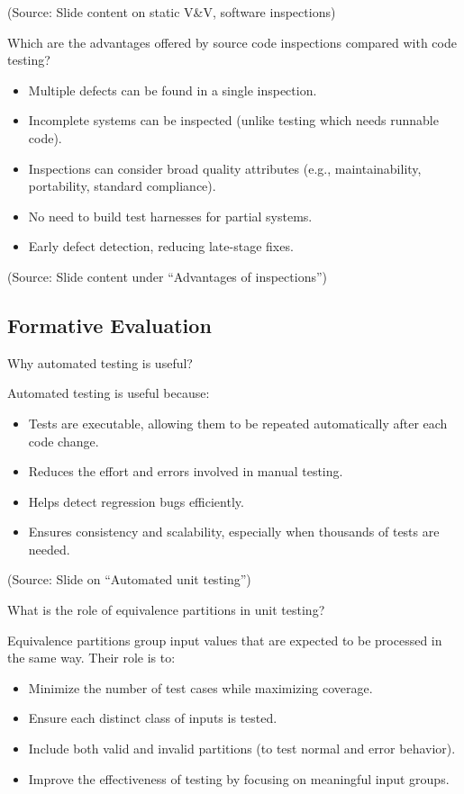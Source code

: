 \documentclass[12pt]{article}
\begin{document}
(Source: Slide content on static V\&V, software inspections)

\begin{questionbox}
Which are the advantages offered by source code inspections compared with code testing?
\end{questionbox}

\begin{itemize}
    \item Multiple defects can be found in a single inspection.
    \item Incomplete systems can be inspected (unlike testing which needs runnable code).
    \item Inspections can consider broad quality attributes (e.g., maintainability, portability, standard compliance).
    \item No need to build test harnesses for partial systems.
    \item Early defect detection, reducing late-stage fixes.
\end{itemize}

(Source: Slide content under ``Advantages of inspections'')

\subsection{Formative Evaluation}

\begin{questionbox}
Why automated testing is useful?
\end{questionbox}

Automated testing is useful because:
\begin{itemize}
    \item Tests are executable, allowing them to be repeated automatically after each code change.
    \item Reduces the effort and errors involved in manual testing.
    \item Helps detect regression bugs efficiently.
    \item Ensures consistency and scalability, especially when thousands of tests are needed.
\end{itemize}

(Source: Slide on ``Automated unit testing'')

\begin{questionbox}
What is the role of equivalence partitions in unit testing?
\end{questionbox}

Equivalence partitions group input values that are expected to be processed in the same way. Their role is to:
\begin{itemize}
    \item Minimize the number of test cases while maximizing coverage.
    \item Ensure each distinct class of inputs is tested.
    \item Include both valid and invalid partitions (to test normal and error behavior).
    \item Improve the effectiveness of testing by focusing on meaningful input groups.
\end{itemize}
\end{document}
